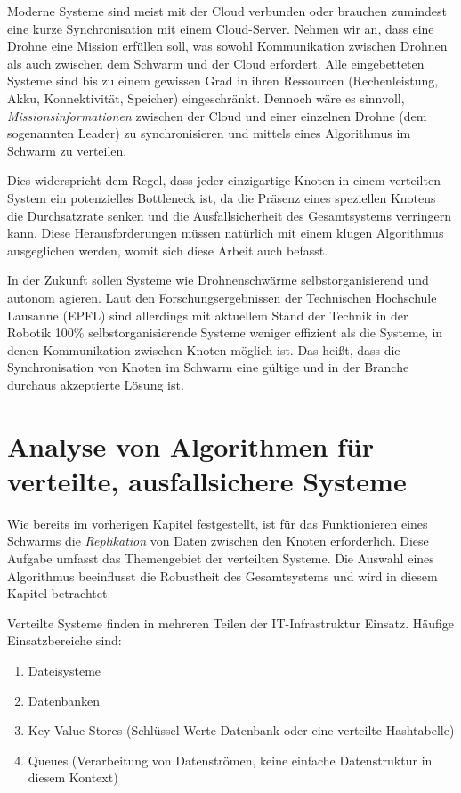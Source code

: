 Moderne Systeme sind meist mit der Cloud verbunden oder brauchen zumindest eine kurze Synchronisation mit einem Cloud-Server. Nehmen wir an, dass eine Drohne eine Mission erfüllen soll, was sowohl Kommunikation zwischen Drohnen als auch zwischen dem Schwarm und der Cloud erfordert. Alle eingebetteten Systeme sind bis zu einem gewissen Grad in ihren Ressourcen (Rechenleistung, Akku, Konnektivität, Speicher) eingeschränkt. Dennoch wäre es sinnvoll, \textit{Missionsinformationen} zwischen der Cloud und einer einzelnen Drohne (dem sogenannten Leader) zu synchronisieren und mittels eines Algorithmus im Schwarm zu verteilen.

Dies widerspricht dem Regel, dass jeder einzigartige Knoten in einem verteilten System ein potenzielles Bottleneck ist, da die Präsenz eines speziellen Knotens die Durchsatzrate senken und die Ausfallsicherheit des Gesamtsystems verringern kann. Diese Herausforderungen müssen natürlich mit einem klugen Algorithmus ausgeglichen werden, womit sich diese Arbeit auch befasst.

In der Zukunft sollen Systeme wie Drohnenschwärme selbstorganisierend und autonom agieren. Laut den Forschungsergebnissen der Technischen Hochschule Lausanne (EPFL) sind allerdings mit aktuellem Stand der Technik in der Robotik 100\% selbstorganisierende Systeme weniger effizient als die Systeme, in denen Kommunikation zwischen Knoten möglich ist. Das heißt, dass die Synchronisation von Knoten im Schwarm eine gültige und in der Branche durchaus akzeptierte Lösung ist.

\section{Analyse von Algorithmen für verteilte, ausfallsichere Systeme}
\label{cha:concurrency}

Wie bereits im vorherigen Kapitel festgestellt, ist für das Funktionieren eines Schwarms die \textit{Replikation} von Daten zwischen den Knoten erforderlich. Diese Aufgabe umfasst das Themengebiet der verteilten Systeme. Die Auswahl eines Algorithmus beeinflusst die Robustheit des Gesamtsystems und wird in diesem Kapitel betrachtet.

Verteilte Systeme finden in mehreren Teilen der IT-Infrastruktur Einsatz. Häufige Einsatzbereiche sind:

\begin{enumerate}
	\item Dateisysteme
	
	\item Datenbanken
	
	\item Key-Value Stores (Schlüssel-Werte-Datenbank oder eine verteilte Hashtabelle)
	
	\item Queues (Verarbeitung von Datenströmen, keine einfache Datenstruktur in diesem Kontext)
\end{enumerate}

